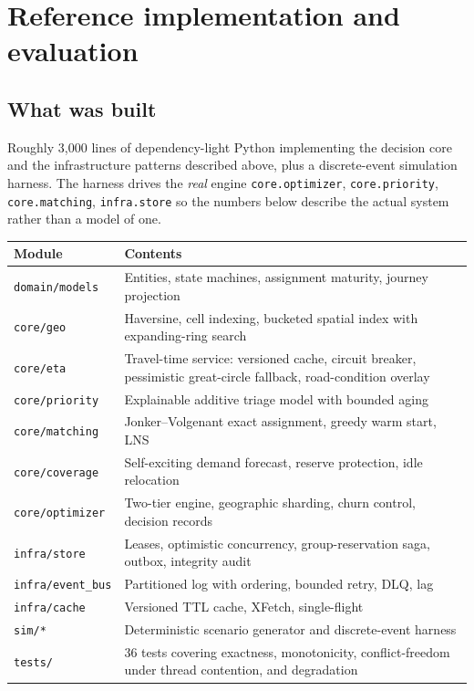 \section{Reference implementation and evaluation}
\label{sec:eval}

\subsection{What was built}

Roughly 3{,}000 lines of dependency-light Python implementing the decision core
and the infrastructure patterns described above, plus a discrete-event
simulation harness. The harness drives the \emph{real} engine \textemdash{}
\texttt{core.optimizer}, \texttt{core.priority}, \texttt{core.matching},
\texttt{infra.store} \textemdash{} so the numbers below describe the actual
system rather than a model of one.

\begin{center}\footnotesize
\begin{tabular}{@{}lp{80mm}@{}}
\toprule
\textbf{Module} & \textbf{Contents} \\
\midrule
\texttt{domain/models} & Entities, state machines, assignment maturity, journey projection \\
\texttt{core/geo} & Haversine, cell indexing, bucketed spatial index with expanding-ring search \\
\texttt{core/eta} & Travel-time service: versioned cache, circuit breaker, pessimistic great-circle fallback, road-condition overlay \\
\texttt{core/priority} & Explainable additive triage model with bounded aging \\
\texttt{core/matching} & Jonker--Volgenant exact assignment, greedy warm start, LNS \\
\texttt{core/coverage} & Self-exciting demand forecast, reserve protection, idle relocation \\
\texttt{core/optimizer} & Two-tier engine, geographic sharding, churn control, decision records \\
\texttt{infra/store} & Leases, optimistic concurrency, group-reservation saga, outbox, integrity audit \\
\texttt{infra/event\_bus} & Partitioned log with ordering, bounded retry, DLQ, lag \\
\texttt{infra/cache} & Versioned TTL cache, XFetch, single-flight \\
\texttt{sim/*} & Deterministic scenario generator and discrete-event harness \\
\texttt{tests/} & 36 tests covering exactness, monotonicity, conflict-freedom under thread contention, and degradation \\
\bottomrule
\end{tabular}
\end{center}

